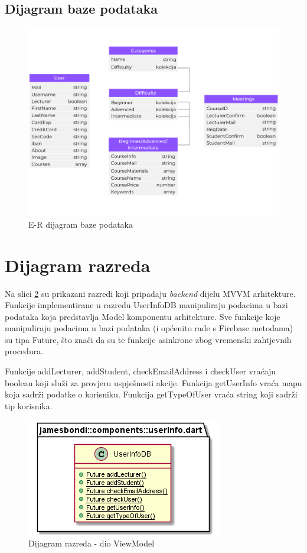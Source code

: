 			\subsection{Dijagram baze podataka}
				\begin{figure}[H]
					\includegraphics[scale=0.6]{dijagrami/ER_baza_podataka.PNG} 
					\centering
					\caption{E-R dijagram baze podataka}
					\label{fig:ER}
				\end{figure} 
			
			\eject
			
			
		\section{Dijagram razreda}
		
			Na slici \ref{fig:ViewModel} su prikazani razredi koji pripadaju \textit{backend} dijelu MVVM arhitekture. Funkcije implementirane u razredu UserInfoDB manipuliraju podacima u bazi podataka koja predstavlja Model komponentu arhitekture. Sve funkcije koje manipuliraju podacima u bazi podataka (i općenito rade s Firebase metodama) su tipa Future, što znači da su te funkcije asinkrone zbog vremenski zahtjevnih procedura.
			
			Funkcije addLecturer, addStudent, checkEmailAddress i checkUser vraćaju boolean koji služi za provjeru uspješnosti akcije. Funkcija getUserInfo vraća mapu koja sadrži podatke o korisniku. Funkcija getTypeOfUser vraća string koji sadrži tip korisnika.
			
			\begin{figure}[h]
				\includegraphics[scale=1]{dijagrami/ViewModel.PNG}
				\centering
				\caption{Dijagram razreda - dio ViewModel}
				\label{fig:ViewModel}
			\end{figure}
			
